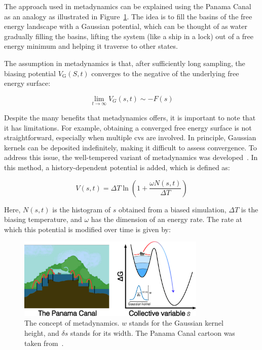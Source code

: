 The approach used in metadynamics can be explained using the Panama Canal as an analogy as illustrated in Figure~\ref{fig:metadynamics}. The idea is to fill the basins of the free energy landscape with a Gaussian potential, which can be thought of as water gradually filling the basins, lifting the system (like a ship in a lock) out of a free energy minimum and helping it traverse to other states.

The assumption in metadynamics is that, after sufficiently long sampling, the biasing potential $V_{\text{G}}(S, t)$ converges to the negative of the underlying free energy surface:

\begin{equation}
    \label{eq:free_energy_from_metadynamics}
    \lim_{t \to \infty} V_G(s,t) \sim -F(s)
\end{equation}

Despite the many benefits that metadynamics offers, it is important to note that it has limitations. For example, obtaining a converged free energy surface is not straightforward, especially when multiple \acp{cv} are involved. In principle, Gaussian kernels can be deposited indefinitely, making it difficult to assess convergence. To address this issue, the well-tempered variant of metadynamics was developed~\citep{barducciWellTemperedMetadynamicsSmoothly2008}. In this method, a history-dependent potential is added, which is defined as:

\begin{equation}
    V(s, t) = \Delta T \ln\left(1 + \frac{\omega N(s, t)}{\Delta T}\right)
    \label{eq:history_dependant_potential}
\end{equation}

Here, $N(s, t)$ is the histogram of $s$ obtained from a biased simulation, $\Delta T$ is the biasing temperature, and $\omega$ has the dimension of an energy rate. The rate at which this potential is modified over time is given by:

\begin{figure}[t!]
    \centering
    \includegraphics[width=0.8\textwidth]{Figures/2_Theory/theory_metadynamics.png}
    \caption{The concept of metadynamics. $w$ stands for the Gaussian kernel height, and $\delta s$ stands for its width. The Panama Canal cartoon was taken from~\citep{HowPanamaCanal}.}
    \label{fig:metadynamics}
\end{figure}


